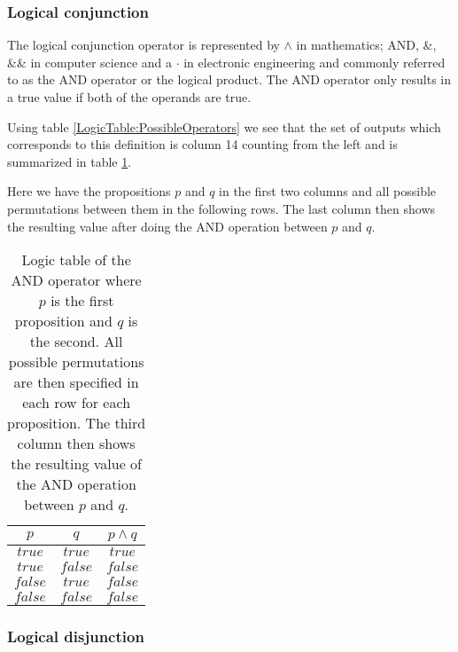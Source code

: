             \subsubsection{Logical conjunction}
        
                The logical conjunction operator is represented by $\wedge$ in mathematics; AND, \&, \&\& in computer science and a $\cdot$ in electronic engineering and commonly referred to as the AND operator or the logical product. The AND operator only results in a true value if both of the operands are true.
                
                Using table \ref{LogicTable:PossibleOperators} we see that the set of outputs which corresponds to this definition is column 14 counting from the left and is summarized in table \ref{LogicTable:AND}. 
                
                Here we have the propositions $p$ and $q$ in the first two columns and all possible permutations between them in the following rows. The last column then shows the resulting value after doing the AND operation between $p$ and $q$. 
                
                \begin{table}[h!]
                    \centering
                    \begin{tabular}{|c|c|c|}
                    	\hline
                    	  $p$   &   $q$   & $p \wedge q$ \\ \hline
                    	$true$  & $true$  &    $true$    \\ \hline
                    	$true$  & $false$ &   $false$    \\ \hline
                    	$false$ & $true$  &   $false$    \\ \hline
                    	$false$ & $false$ &   $false$    \\ \hline
                    \end{tabular}
                    \caption{Logic table of the AND operator where $p$ is the first proposition and $q$ is the second. All possible permutations are then specified in each row for each proposition. The third column then shows the resulting value of the AND operation between $p$ and $q$.}
                    \label{LogicTable:AND}
                \end{table}
            
            \subsubsection{Logical disjunction}
            
